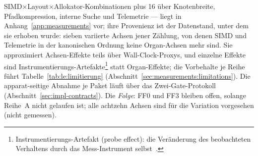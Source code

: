 \begin{nurlang}
SIMD$\times$Layout$\times$Allokator-Kombinationen plus 16 über Knotenbreite, Pfadkompression, interne
Suche und Telemetrie --- liegt in Anhang~\ref{app:measurements} vor; ihre Provenienz ist der Datenstand,
unter dem sie erhoben wurde: sieben variierte Achsen jener Zählung, von denen SIMD und Telemetrie in der
kanonischen Ordnung keine Organ-Achsen mehr sind. Sie approximiert Achsen-Effekte teils über
Wall-Clock-Proxys, und einzelne Effekte sind Instrumentierungs-Artefakte\footnote{Instrumentierungs-Artefakt
(probe effect): die Veränderung des beobachteten Verhaltens durch das Mess-Instrument
selbst~\cite{gait1986probe}.} statt Organ-Effekte; die Vorbehalte je Reihe führt
Tabelle~\ref{tab:le:limitierung} (Abschnitt~\ref{sec:measurements:limitations}). Die apparat-seitige
Abnahme je Paket läuft über das Zwei-Gate-Protokoll (Abschnitt~\ref{sec:impl-contracts}). Die \emph{Folge}:
FF0 und FF3 bleiben offen, solange Reihe~A nicht gelaufen ist; alle achtzehn Achsen sind für die Variation vorgesehen (nicht gemessen).
\end{nurlang}
